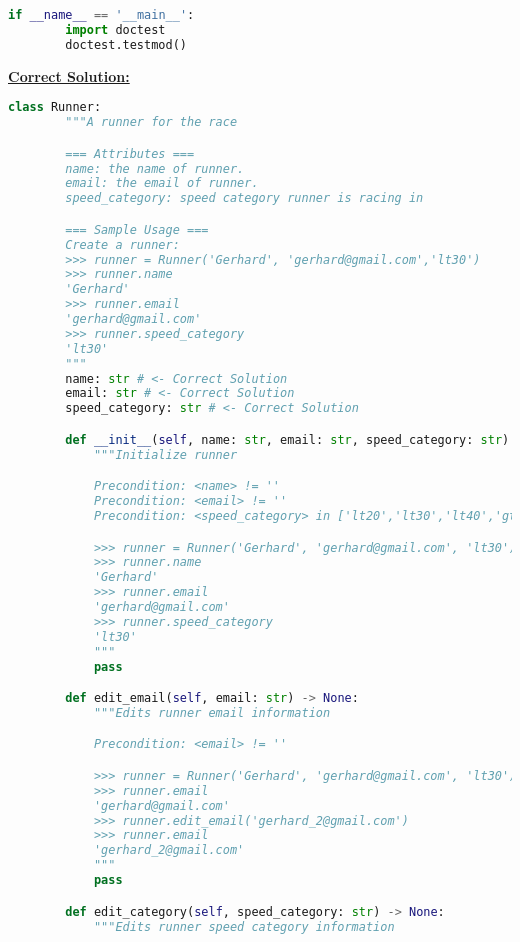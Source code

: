 \documentclass[12pt]{article}
\begin{document}
\begin{enumerate}[1.]
\begin{lstlisting}[language=Python]
    if __name__ == '__main__':
        import doctest
        doctest.testmod()

\end{lstlisting}

\begin{mdframed}
    \underline{\textbf{Correct Solution:}}

    \bigskip

    \begin{lstlisting}[language=Python]
        class Runner:
        """A runner for the race

        === Attributes ===
        name: the name of runner.
        email: the email of runner.
        speed_category: speed category runner is racing in

        === Sample Usage ===
        Create a runner:
        >>> runner = Runner('Gerhard', 'gerhard@gmail.com','lt30')
        >>> runner.name
        'Gerhard'
        >>> runner.email
        'gerhard@gmail.com'
        >>> runner.speed_category
        'lt30'
        """
        name: str # <- Correct Solution
        email: str # <- Correct Solution
        speed_category: str # <- Correct Solution

        def __init__(self, name: str, email: str, speed_category: str) -> None:
            """Initialize runner

            Precondition: <name> != ''
            Precondition: <email> != ''
            Precondition: <speed_category> in ['lt20','lt30','lt40','gt40','']

            >>> runner = Runner('Gerhard', 'gerhard@gmail.com', 'lt30')
            >>> runner.name
            'Gerhard'
            >>> runner.email
            'gerhard@gmail.com'
            >>> runner.speed_category
            'lt30'
            """
            pass

        def edit_email(self, email: str) -> None:
            """Edits runner email information

            Precondition: <email> != ''

            >>> runner = Runner('Gerhard', 'gerhard@gmail.com', 'lt30')
            >>> runner.email
            'gerhard@gmail.com'
            >>> runner.edit_email('gerhard_2@gmail.com')
            >>> runner.email
            'gerhard_2@gmail.com'
            """
            pass

        def edit_category(self, speed_category: str) -> None:
            """Edits runner speed category information


\end{lstlisting}
\end{mdframed}
\end{enumerate}
\end{document}
